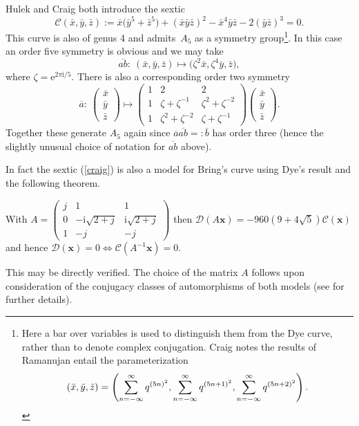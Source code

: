 \documentclass[pdftex]{sigma}
\numberwithin{equation}{section}
\newcommand{\mi}{\mathrm{i}}
\newcommand{\me}{\mathrm{e}}
\renewcommand{\vec}[1]{\mathbf{#1}}
\newcommand{\cx}{\bar{x}}
\newcommand{\cy}{\bar{y}}
\newcommand{\cz}{\bar{z}}
\begin{document}
Hulek and Craig both introduce the sextic
\begin{equation}
\label{craig}
  \mathcal{C}(\cx,\cy,\cz) :=
    \cx\big(\cy^5+\cz^5\big) + (\cx\cy\cz)^2 - \cx^4\cy\cz -2(\cy\cz)^3  = 0.
\end{equation}
This curve is also of genus 4
and admits~$A_5$ as a symmetry group\footnote{Here a bar over
  variables is used to distinguish them from the Dye curve, rather
  than to denote complex conjugation. Craig notes the results of Ramanujan \cite[Chapter~19, Entry 10(iv), 10(vii)]{berndtiii}
entail the parameterization
\begin{gather*}
(\cx,\cy,\cz)
 =
\left(\sum_{n=-\infty}\sp{\infty} q^{(5n)^2},\sum_{n=-\infty}\sp{\infty} q^{(5n+1)^2},
\sum_{n=-\infty}\sp{\infty} q^{(5n+2)^2}\right).
\end{gather*}}.
In this case an order f\/ive symmetry is obvious and we may take
\begin{equation*}
  \overline{ab} : \ (\cx,\cy,\cz) \mapsto \big(\zeta^2 \cx, \zeta^4 \cy, \cz\big),
\end{equation*}
where $\zeta=\me^{2\pi\mi/5}$.
There is also a corresponding order two symmetry
\[ \overline{a} : \
  \begin{pmatrix}
    \cx\\\cy\\\cz
  \end{pmatrix}
  \mapsto
  \begin{pmatrix}
    1 & 2                 & 2 \\
    1 & \zeta+\zeta^{-1}   & \zeta^2+\zeta^{-2} \\
    1 & \zeta^2+\zeta^{-2} & \zeta+\zeta^{-1}
  \end{pmatrix}
  \begin{pmatrix}
    \cx\\\cy\\\cz
  \end{pmatrix}.
\]
Together these generate $A_5$ again since $\overline{a}\overline{ab} =:
\overline{b}$ has order three (hence the slightly unusual choice of
notation for $\overline{ab}$ above).

In fact the sextic (\ref{craig}) is also a model for Bring's curve using Dye's result and the following theorem.
\begin{theorem} With
$
  A =
  \begin{pmatrix}
    j & 1              & 1 \\
    0 & -\mi\sqrt{2+j} & \mi\sqrt{2+j} \\
    1 & -j             & -j
  \end{pmatrix}
$
then
$
  \mathcal{D}(A\vec{x}) = -960(9 + 4\sqrt{5}) \mathcal{C}(\vec{x})$
{and hence}
  $\mathcal{D}(\vec{x}) = 0 \iff \mathcal{C}(A^{-1} \vec{x}) = 0
$.
\end{theorem}
This may be directly verif\/ied. The choice of the matrix $A$ follows upon consideration of the
conjugacy classes of automorphisms of both models (see \cite{northover} for further details).
\end{document}
